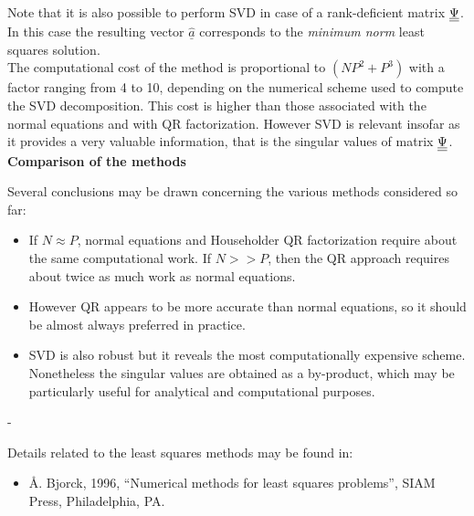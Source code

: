 {Note that it is also possible to perform SVD in case of a rank-deficient matrix $\underline{\underline{\Psi}}$. In this case the resulting vector $\widehat{\underline{a}}$ corresponds to the \emph{minimum norm} least squares solution. \\

The computational cost of the method is proportional to $(NP^2 + P^3)$ with a factor ranging from 4 to 10, depending on the numerical scheme used to compute the SVD decomposition. This cost is higher than those associated with the normal equations and with QR factorization. However SVD is relevant insofar as it provides a very valuable information, that is the singular values of matrix $\underline{\underline{\Psi}}$. \\

\textbf{Comparison of the methods} \vspace{2mm}

Several conclusions may be drawn concerning the various methods considered so far:
\begin{itemize}
\item If $N \approx P$, normal equations and Householder QR factorization require about the same computational work. If $N >> P$, then the QR approach requires about twice as much work as normal equations.
\item However QR appears to be more accurate than normal equations, so it should be almost always preferred in practice.
\item SVD is also robust but it reveals the most computationally expensive scheme. Nonetheless the singular values are obtained as a by-product, which may be particularly useful for analytical and computational purposes.
\end{itemize}

}
{-
}

{
Details related to the least squares methods may be found in:
\begin{itemize}
  \item {\AA}. Bjorck, 1996, ``Numerical methods for least squares problems'', SIAM Press, Philadelphia, PA.
  \end{itemize}
}


